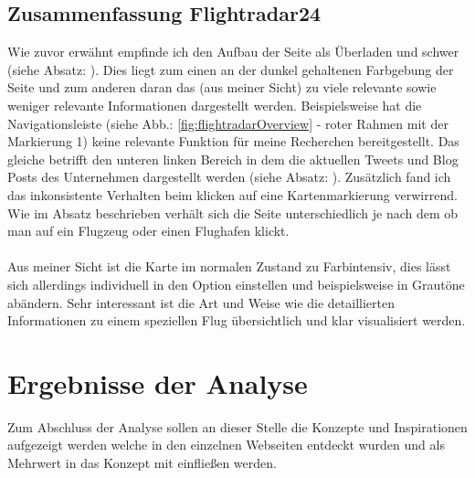 \documentclass[../Bachelorarbeit.tex]{subfiles}
\begin{document}
\subsection{Zusammenfassung Flightradar24}
Wie zuvor erwähnt empfinde ich den Aufbau der Seite als Überladen und schwer (siehe Absatz: ). 
Dies liegt zum einen an der dunkel gehaltenen Farbgebung der Seite und zum anderen daran das (aus meiner Sicht) zu viele relevante sowie weniger relevante Informationen dargestellt werden.
Beispielsweise hat die Navigationsleiste (siehe Abb.: \ref{fig:flightradarOverview} - roter Rahmen mit der Markierung 1) keine relevante Funktion für meine Recherchen bereitgestellt. 
Das gleiche betrifft den unteren linken Bereich in dem die aktuellen Tweets und Blog Posts des Unternehmen dargestellt werden (siehe Absatz: ). 
Zusätzlich fand ich das inkonsistente Verhalten beim klicken auf eine Kartenmarkierung verwirrend. 
Wie im Absatz  beschrieben verhält sich die Seite unterschiedlich je nach dem ob man auf ein Flugzeug oder einen Flughafen klickt.\\
\\
Aus meiner Sicht ist die Karte im normalen Zustand zu Farbintensiv, dies lässt sich allerdings individuell in den Option einstellen und beispielsweise in Grautöne abändern.
Sehr interessant ist die Art und Weise wie die detaillierten Informationen zu einem speziellen Flug übersichtlich und klar visualisiert werden.

\section{Ergebnisse der Analyse}
Zum Abschluss der Analyse sollen an dieser Stelle die Konzepte und Inspirationen aufgezeigt werden welche in den einzelnen Webseiten entdeckt wurden und als Mehrwert in das Konzept mit einfließen werden.
\end{document}
